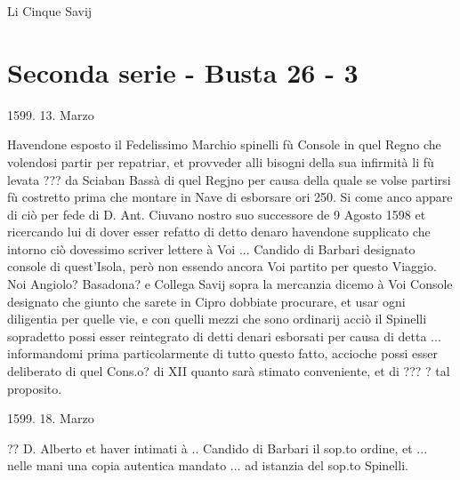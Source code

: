 Li Cinque Savij

\section{Seconda serie - Busta 26 - 3}

\setcounter{docnumber}{17}


\begin{center}
1599. 13. Marzo
\end{center}

Havendone esposto  il Fedelissimo Marchio spinelli fù  Console in quel
Regno che  volendosi partir per  repatriar, et provveder  alli bisogni
della sua infirmità  li fù levata ??? da Sciaban  Bassà di quel Regjno
per causa della quale se volse partirsi fù costretto prima che montare
in Nave di esborsare  ori 250. Si come anco appare di  ciò per fede di
D. Ant. Ciuvano  nostro suo successore de 9  Agosto 1598 et ricercando
lui di  dover esser refatto  di detto denaro havendone  supplicato che
intorno ciò  dovessimo scriver  lettere à Voi  ... Candido  di Barbari
designato console di quest'Isola,  però non essendo ancora Voi partito
per questo  Viaggio. Noi Angiolo?  Basadona? e Collega Savij  sopra la
mercanzia  dicemo à  Voi Console  designato che  giunto che  sarete in
Cipro dobbiate  procurare, et usar  ogni diligentia per quelle  vie, e
con quelli mezzi che sono ordinarij acciò il Spinelli sopradetto possi
esser  reintegrato  di  detti  denari  esborsati per  causa  di  detta
... informandomi prima particolarmente di tutto questo fatto, accioche
possi  esser deliberato  di quel  Cons.o? di  XII quanto  sarà stimato
conveniente, et di ??? ? tal proposito.

\begin{center}
1599. 18. Marzo
\end{center}

?? D.  Alberto et  haver intimati  à .. Candido  di Barbari  il sop.to
ordine, et ... nelle mani  una copia autentica mandato ... ad istanzia
del sop.to Spinelli.
